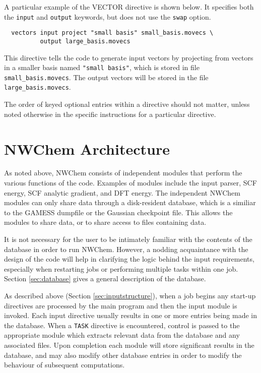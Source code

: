 A particular example of the VECTOR directive is shown below.  It specifies
both the \verb+input+ and \verb+output+ keywords, but does not use the 
\verb+swap+ option.

\begin{verbatim}
  vectors input project "small basis" small_basis.movecs \
          output large_basis.movecs
\end{verbatim}

This directive tells the code to generate input vectors by projecting
from vectors in a smaller basis named \verb+"small basis"+, which is
stored in file \verb+small_basis.movecs+.  The output vectors will be
stored in the file \verb+large_basis.movecs+.

The order of keyed optional entries within a directive should not matter,
unless noted otherwise in the specific instructions for a particular
directive.

\section{NWChem Architecture}
\label{sec:arch}

As noted above, NWChem consists of independent modules that perform
the various functions of the code.  Examples of modules include the
input parser, SCF energy, SCF analytic gradient, and DFT energy.  The
independent NWChem modules can only share data through a disk-resident
database, which is a similiar to the GAMESS dumpfile or the Gaussian
checkpoint file.  This allows the modules to share data, or to share
access to files containing data.

It is not necessary for the user to be intimately familiar with the
contents of the database in order to run NWChem.  However, a nodding
acquaintance with the design of the code will help in clarifying the
logic behind the input requirements, especially when restarting jobs
or performing multiple tasks within one job.  Section
\ref{sec:database} gives a general description of the database.

As described above (Section \ref{sec:inputstructure}), when a job
begins any start-up directives are processed by the main program and
then the input module is invoked.  Each input directive usually
results in one or more entries being made in the database.  When a
\verb+TASK+ directive is encountered, control is passed to the
appropriate module which extracts relevant data from the database and
any associated files.  Upon completion each module will store
significant results in the database, and may also modify other
database entries in order to modify the behaviour of subsequent
computations.

